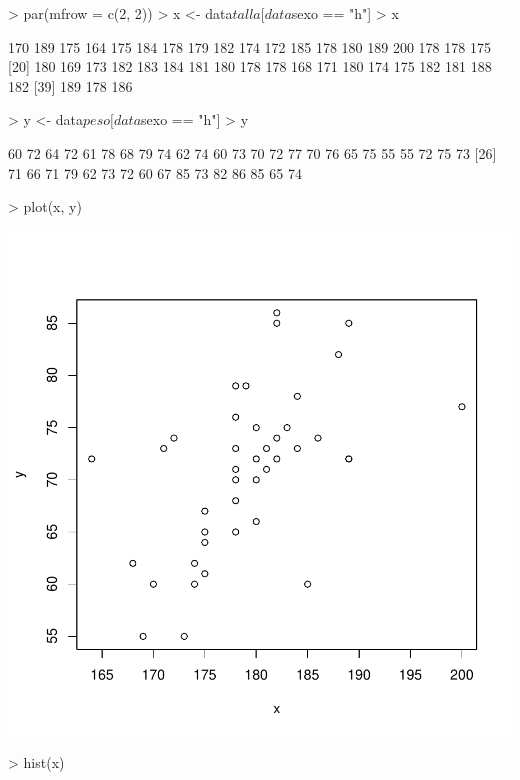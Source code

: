 \documentclass[12pt]{article}
\begin{document}
\begin{Schunk}
\begin{Sinput}
> par(mfrow = c(2, 2))
> x <- data$talla[data$sexo == "h"]
> x
\end{Sinput}
\begin{Soutput}
 [1] 170 189 175 164 175 184 178 179 182 174 172 185 178 180 189 200 178 178 175
[20] 180 169 173 182 183 184 181 180 178 178 168 171 180 174 175 182 181 188 182
[39] 189 178 186
\end{Soutput}
\begin{Sinput}
> y <- data$peso[data$sexo == "h"]
> y
\end{Sinput}
\begin{Soutput}
 [1] 60 72 64 72 61 78 68 79 74 62 74 60 73 70 72 77 70 76 65 75 55 55 72 75 73
[26] 71 66 71 79 62 73 72 60 67 85 73 82 86 85 65 74
\end{Soutput}
\end{Schunk}
\begin{Schunk}
\begin{Sinput}
> plot(x, y)
\end{Sinput}
\end{Schunk}
\includegraphics{ensayo-010}
\begin{Schunk}
\begin{Sinput}
> hist(x)
\end{Sinput}
\end{Schunk}
\end{document}
